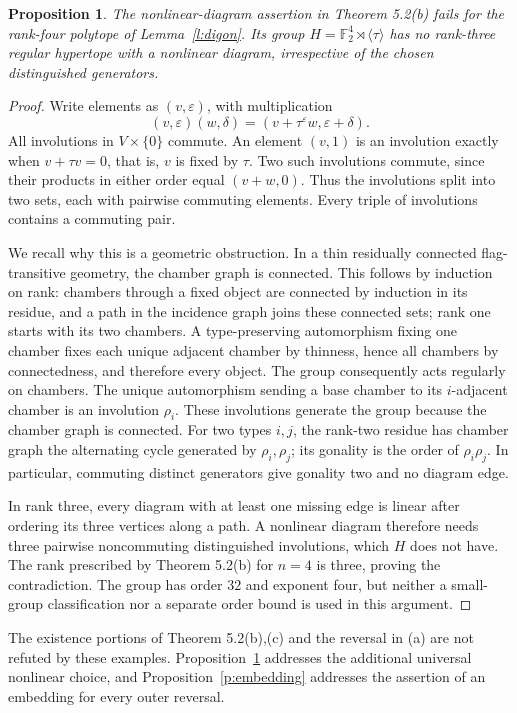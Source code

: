\documentclass[11pt,a4paper]{article}
\newtheorem{proposition}{Proposition}
\newcommand{\F}{\mathbb F}
\begin{document}
\begin{proposition}\label{p:nonlinear}
The nonlinear-diagram assertion in Theorem 5.2(b) fails for the rank-four
polytope of Lemma~\ref{l:digon}. Its group $H=\F_2^4\rtimes\langle\tau\rangle$
has no rank-three regular hypertope with a nonlinear diagram, irrespective
of the chosen distinguished generators.
\end{proposition}
\begin{proof}
Write elements as $(v,\varepsilon)$, with multiplication
\[
 (v,\varepsilon)(w,\delta)
       =(v+\tau^\varepsilon w,\varepsilon+\delta).
\]
All involutions in $V\times\{0\}$ commute. An element $(v,1)$ is an
involution exactly when $v+\tau v=0$, that is, $v$ is fixed by $\tau$.
Two such involutions commute, since their products in either order equal
$(v+w,0)$. Thus the involutions split into two sets, each with pairwise
commuting elements. Every triple of involutions contains a commuting pair.

We recall why this is a geometric obstruction. In a thin residually
connected flag-transitive geometry, the chamber graph is connected.
This follows by induction on rank: chambers through a fixed object are
connected by induction in its residue, and a path in the incidence graph
joins these connected sets; rank one starts with its two chambers.
A type-preserving automorphism fixing one chamber fixes each unique
adjacent chamber by thinness, hence all chambers by connectedness, and
therefore every object. The group consequently acts regularly on
chambers. The unique automorphism sending a base chamber to its
$i$-adjacent chamber is an involution $\rho_i$. These involutions generate
the group because the chamber graph is connected. For two types $i,j$,
the rank-two residue has chamber graph the alternating cycle generated by
$\rho_i,\rho_j$; its gonality is the order of $\rho_i\rho_j$. In particular,
commuting distinct generators give gonality two and no diagram edge.

In rank three, every diagram with at least one missing edge is linear
after ordering its three vertices along a path. A nonlinear diagram
therefore needs three pairwise noncommuting distinguished involutions,
which $H$ does not have. The rank prescribed by Theorem 5.2(b) for $n=4$
is three, proving the contradiction. The group has order $32$ and exponent
four, but neither a small-group classification nor a separate order bound
is used in this argument.
\end{proof}
The existence portions of Theorem 5.2(b),(c) and the reversal in (a) are
not refuted by these examples. Proposition~\ref{p:nonlinear} addresses
the additional universal nonlinear choice, and Proposition~\ref{p:embedding}
addresses the assertion of an embedding for every outer reversal.
\end{document}
